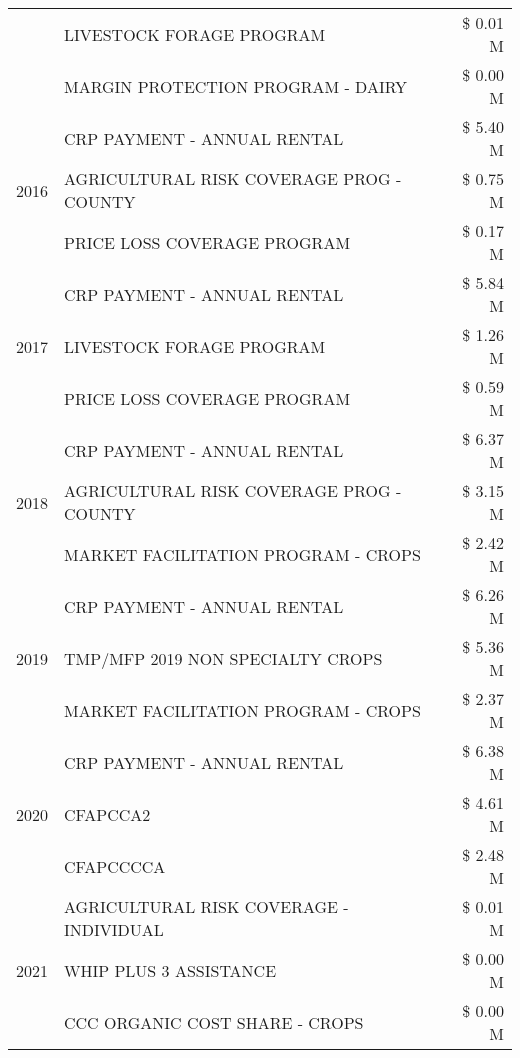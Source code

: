 \begin{tabular}{llr}
 & LIVESTOCK FORAGE PROGRAM & \$ 0.01 M \\
 & MARGIN PROTECTION PROGRAM - DAIRY & \$ 0.00 M \\
\cline{1-3}
\multirow[t]{3}{*}{2016} & CRP PAYMENT - ANNUAL RENTAL & \$ 5.40 M \\
 & AGRICULTURAL RISK COVERAGE PROG - COUNTY & \$ 0.75 M \\
 & PRICE LOSS COVERAGE PROGRAM & \$ 0.17 M \\
\cline{1-3}
\multirow[t]{3}{*}{2017} & CRP PAYMENT - ANNUAL RENTAL & \$ 5.84 M \\
 & LIVESTOCK FORAGE PROGRAM & \$ 1.26 M \\
 & PRICE LOSS COVERAGE PROGRAM & \$ 0.59 M \\
\cline{1-3}
\multirow[t]{3}{*}{2018} & CRP PAYMENT - ANNUAL RENTAL & \$ 6.37 M \\
 & AGRICULTURAL RISK COVERAGE PROG - COUNTY & \$ 3.15 M \\
 & MARKET FACILITATION PROGRAM - CROPS & \$ 2.42 M \\
\cline{1-3}
\multirow[t]{3}{*}{2019} & CRP PAYMENT - ANNUAL RENTAL & \$ 6.26 M \\
 & TMP/MFP 2019 NON SPECIALTY CROPS & \$ 5.36 M \\
 & MARKET FACILITATION PROGRAM - CROPS & \$ 2.37 M \\
\cline{1-3}
\multirow[t]{3}{*}{2020} & CRP PAYMENT - ANNUAL RENTAL & \$ 6.38 M \\
 & CFAPCCA2 & \$ 4.61 M \\
 & CFAPCCCCA & \$ 2.48 M \\
\cline{1-3}
\multirow[t]{3}{*}{2021} & AGRICULTURAL RISK COVERAGE - INDIVIDUAL & \$ 0.01 M \\
 & WHIP PLUS 3 ASSISTANCE & \$ 0.00 M \\
 & CCC ORGANIC COST SHARE - CROPS & \$ 0.00 M \\
\cline{1-3}
\bottomrule
\end{tabular}
